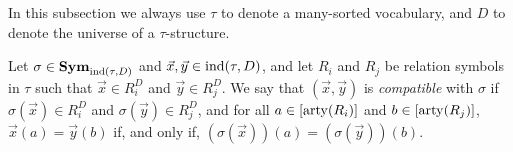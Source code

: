 \documentclass[../paper.tex]{subfiles}
\begin{document}


In this subsection we always use $\tau$ to denote a many-sorted vocabulary, and
$D$ to denote the universe of a $\tau$-structure.


\begin{definition}
  Let $\sigma \in \text{\textbf{Sym}}_{\text{\upshape ind}(\tau, D)}$ and $\vec{x}, \vec{y} \in \text{\upshape ind}(\tau,
  D)$, and let $R_i$ and $R_j$ be relation symbols in $\tau$ such that $\vec{x}
  \in R^{D}_i$ and $\vec{y} \in R^{D}_j$. We say that $(\vec{x}, \vec{y})$ is
  \emph{compatible} with $\sigma$ if $\sigma (\vec{x}) \in R^{D}_i$ and $\sigma
  (\vec{y}) \in R^D_j$, and for all $a \in [\mathrm{arty}(R_i)]$ and $b \in
  [\mathrm{arty}(R_j)]$, $\vec{x}(a) = \vec{y}(b)$ if, and only if, $(\sigma
  (\vec{x}))(a) = (\sigma(\vec{y}))(b)$.

\end{definition}
\end{document}
